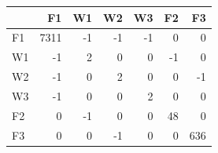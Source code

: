 \begin{tabular}{lrrrrrr}
\toprule
 & F1 & W1 & W2 & W3 & F2 & F3 \\
\midrule
F1 & 7311 & -1 & -1 & -1 & 0 & 0 \\
W1 & -1 & 2 & 0 & 0 & -1 & 0 \\
W2 & -1 & 0 & 2 & 0 & 0 & -1 \\
W3 & -1 & 0 & 0 & 2 & 0 & 0 \\
F2 & 0 & -1 & 0 & 0 & 48 & 0 \\
F3 & 0 & 0 & -1 & 0 & 0 & 636 \\
\bottomrule
\end{tabular}
